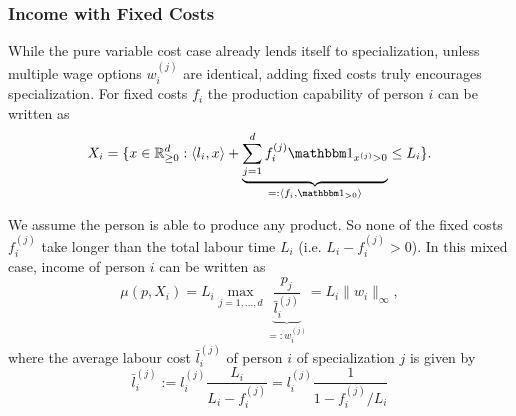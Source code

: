 \subsubsection{Income with Fixed Costs}

While the pure variable cost case already lends itself to specialization, unless
multiple wage options \(w_i^{(j)}\) are identical, adding fixed costs truly
encourages specialization. For fixed costs \(f_i\) the production capability
of person \(i\) can be written as 
\[
	X_i = \{
		x\in \real_{\ge 0}^\dims
		: \langle l_i, x\rangle
		+ \underbrace{
			\sum_{j=1}^\dims f_i^{(j)}\ind_{x^{(j)}>0}
		}_{=: \langle f_i, \ind_{>0}\rangle} \le L_i
	\}.
\]

\begin{lemma}
	We assume the person is able to produce any product. So none of the fixed
	costs \(f_i^{(j)}\) take longer than the total labour time \(L_i\) (i.e.
	\(L_i - f_i^{(j)} > 0\)). In this mixed case, income of person \(i\) can be
	written as		
	\[
		\mu(p, X_i)
		= L_i \max_{j=1,\dots,d}
		\underbrace{\frac{p_j}{\bar{l}_i^{(j)}}}_{=:w_i^{(j)}}
		= L_i \|w_i\|_\infty,
	\]
	where the average labour cost \(\bar{l}_i^{(j)}\) of person \(i\) of
	specialization \(j\) is given by
	\[
		\bar{l}_i^{(j)}
		:= l_i^{(j)}\frac{L_i}{L_i-f_i^{(j)}}
		= l_i^{(j)}\frac{1}{1-f_i^{(j)}/L_i}
	\]
\end{lemma}
